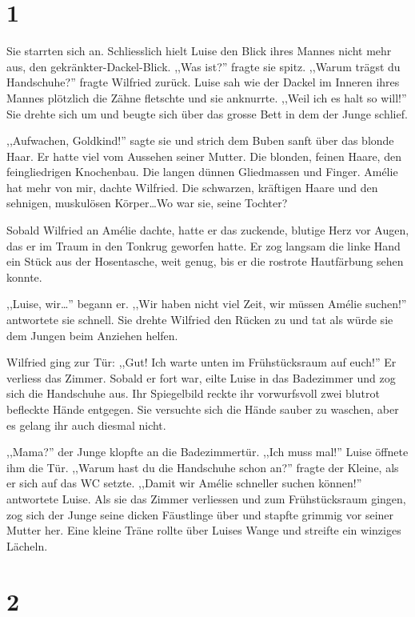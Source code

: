 \documentclass[11pt,titlepage,a5paper]{book}
\begin{document}
\section*{1}

Sie starrten sich an. Schliesslich hielt Luise den Blick ihres Mannes nicht mehr aus, den gekränkter-Dackel-Blick. ,,Was ist?'' fragte sie spitz. ,,Warum trägst du Handschuhe?'' fragte Wilfried zurück. Luise sah wie der Dackel im Inneren ihres Mannes  plötzlich die Zähne fletschte und sie anknurrte. ,,Weil ich es halt so will!'' Sie drehte sich um und beugte sich über das grosse Bett in dem der Junge schlief. 

,,Aufwachen, Goldkind!'' sagte sie und strich dem Buben sanft über das blonde Haar. Er hatte viel vom Aussehen seiner Mutter. Die blonden, feinen Haare, den feingliedrigen Knochenbau. Die langen dünnen Gliedmassen und Finger. Amélie hat mehr von mir, dachte Wilfried. Die schwarzen, kräftigen Haare und den sehnigen, muskulösen Körper\dots Wo war sie, seine Tochter? 

Sobald Wilfried an Amélie dachte, hatte er das zuckende, blutige Herz vor Augen, das er im Traum in den Tonkrug geworfen hatte. Er zog langsam die linke Hand ein Stück aus der Hosentasche, weit genug, bis er die rostrote Hautfärbung sehen konnte.

,,Luise, wir\dots '' begann er. ,,Wir haben nicht viel Zeit, wir müssen Amélie suchen!'' antwortete sie schnell. Sie drehte Wilfried den Rücken zu und tat als würde sie dem Jungen beim Anziehen helfen. 

Wilfried ging zur Tür: ,,Gut! Ich warte unten im Frühstücksraum auf euch!'' Er verliess das Zimmer. Sobald er fort war, eilte Luise in das Badezimmer und zog sich die Handschuhe aus. Ihr Spiegelbild reckte ihr vorwurfsvoll zwei blutrot befleckte Hände entgegen. Sie versuchte sich die Hände sauber zu waschen, aber es gelang ihr auch diesmal nicht. 

,,Mama?'' der Junge klopfte an die Badezimmertür. ,,Ich muss mal!'' Luise öffnete ihm die Tür. ,,Warum hast du die Handschuhe schon an?'' fragte der Kleine, als er sich auf das WC setzte. ,,Damit wir Amélie schneller suchen können!'' antwortete Luise. Als sie das Zimmer verliessen und zum Frühstücksraum gingen, zog sich der Junge seine dicken Fäustlinge über und stapfte grimmig vor seiner Mutter her. Eine kleine Träne rollte über Luises Wange und streifte ein winziges Lächeln.

\section*{2}
\end{document}
